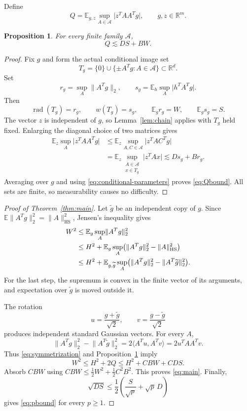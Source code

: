 \documentclass[10pt,a4paper]{amsart}
\numberwithin{equation}{section}
\newtheorem{proposition}[theorem]{Proposition}
\newcommand{\E}{\mathbb E}
\newcommand{\R}{\mathbb R}
\newcommand{\cA}{\mathcal A}
\newcommand{\norm}[1]{\lVert #1\rVert}
\newcommand{\abs}[1]{\lvert #1\rvert}
\newcommand{\ip}[2]{\langle #1,#2\rangle}
\newcommand{\HS}{\mathrm{HS}}
\newcommand{\rad}{\operatorname{rad}}
\begin{document}
Define
\begin{equation}
 Q=\E_{g,z}\sup_{A\in\cA}\abs{z^TAA^Tg},
 \qquad g,z\in\R^m.
 \label{eq:Q}
\end{equation}

\begin{proposition}\label{prop:Q}
For every finite family $\cA$,
\begin{equation}
 \boxed{\quad Q\lesssim DS+BW.\quad}
 \label{eq:Qbound}
\end{equation}
\end{proposition}

\begin{proof}
Fix $g$ and form the actual conditional image set
\[
 T_g=\{0\}\cup\{\pm A^Tg:A\in\cA\}\subset\R^d.
\]
Set
\[
 r_g=\sup_A\norm{A^Tg}_2,
 \qquad s_g=\E_h\sup_A\abs{h^TA^Tg}.
\]
Then
\begin{equation}
 \rad(T_g)=r_g,\qquad w(T_g)=s_g,
 \qquad \E_g r_g=W,\qquad \E_g s_g=S.
 \label{eq:conditional-parameters}
\end{equation}
The vector $z$ is independent of $g$, so Lemma~\ref{lem:chain} applies with $T_g$ held fixed. Enlarging the diagonal choice of two matrices gives
\begin{align*}
 \E_z\sup_A\abs{z^TAA^Tg}
 &\le \E_z\sup_{A,C\in\cA}\abs{z^TAC^Tg}\\
 &=\E_z\sup_{\substack{A\in\cA\\x\in T_g}}\abs{z^TAx}
 \lesssim D s_g+B r_g.
\end{align*}
Averaging over $g$ and using \eqref{eq:conditional-parameters} proves \eqref{eq:Qbound}. All sets are finite, so measurability causes no difficulty.
\end{proof}


\begin{proof}[Proof of Theorem~\ref{thm:main}]
Let $\widetilde g$ be an independent copy of $g$. Since
$\E\norm{A^Tg}_2^2=\norm{A}_{\HS}^2$, Jensen's inequality gives
\begin{align}
 W^2
 &\le \E_g\sup_A\norm{A^Tg}_2^2\notag\\
 &\le H^2+\E_g\sup_A\bigl(\norm{A^Tg}_2^2-\norm{A}_{\HS}^2\bigr)\notag\\
 &\le H^2+\E_{g,\widetilde g}\sup_A
 \bigl(\norm{A^Tg}_2^2-\norm{A^T\widetilde g}_2^2\bigr).
 \label{eq:symmetrization}
\end{align}
For the last step, the supremum is convex in the finite vector of its arguments, and expectation over $\widetilde g$ is moved outside it.

The rotation
\[
 u=\frac{g+\widetilde g}{\sqrt2},\qquad
 v=\frac{g-\widetilde g}{\sqrt2}
\]
produces independent standard Gaussian vectors. For every $A$,
\[
 \norm{A^Tg}_2^2-\norm{A^T\widetilde g}_2^2
 =2\ip{A^Tu}{A^Tv}=2u^TAA^Tv.
\]
Thus \eqref{eq:symmetrization} and Proposition~\ref{prop:Q} imply
\begin{equation}
 W^2\le H^2+2Q\le H^2+C BW+C DS.
 \label{eq:quadratic-closure}
\end{equation}
Absorb $CBW$ using
$CBW\le \tfrac12W^2+\tfrac12C^2B^2$.
This proves \eqref{eq:main}. Finally,
\[
 \sqrt{DS}\le\frac12\left(\frac{S}{\sqrt p}+\sqrt p\,D\right)
\]
gives \eqref{eq:pbound} for every $p\ge1$.
\end{proof}
\end{document}
